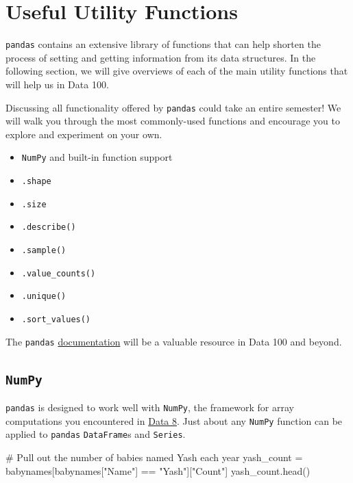 \documentclass[
  letterpaper,
  DIV=11,
  numbers=noendperiod]{scrreprt}
\newenvironment{Shaded}{\begin{snugshade}}{\end{snugshade}}
\newcommand{\CommentTok}[1]{\textcolor[rgb]{0.37,0.37,0.37}{#1}}
\newcommand{\NormalTok}[1]{\textcolor[rgb]{0.00,0.23,0.31}{#1}}
\newcommand{\OperatorTok}[1]{\textcolor[rgb]{0.37,0.37,0.37}{#1}}
\newcommand{\StringTok}[1]{\textcolor[rgb]{0.13,0.47,0.30}{#1}}
\providecommand{\tightlist}{%
  \setlength{\itemsep}{0pt}\setlength{\parskip}{0pt}}\usepackage{longtable,booktabs,array}
\begin{document}
\hypertarget{useful-utility-functions}{%
\section{Useful Utility Functions}\label{useful-utility-functions}}

\texttt{pandas} contains an extensive library of functions that can help
shorten the process of setting and getting information from its data
structures. In the following section, we will give overviews of each of
the main utility functions that will help us in Data 100.

Discussing all functionality offered by \texttt{pandas} could take an
entire semester! We will walk you through the most commonly-used
functions and encourage you to explore and experiment on your own.

\begin{itemize}
\tightlist
\item
  \texttt{NumPy} and built-in function support
\item
  \texttt{.shape}
\item
  \texttt{.size}
\item
  \texttt{.describe()}
\item
  \texttt{.sample()}
\item
  \texttt{.value\_counts()}
\item
  \texttt{.unique()}
\item
  \texttt{.sort\_values()}
\end{itemize}

The \texttt{pandas}
\href{https://pandas.pydata.org/docs/reference/index.html}{documentation}
will be a valuable resource in Data 100 and beyond.

\hypertarget{numpy}{%
\subsection{\texorpdfstring{\texttt{NumPy}}{NumPy}}\label{numpy}}

\texttt{pandas} is designed to work well with \texttt{NumPy}, the
framework for array computations you encountered in
\href{https://www.data8.org/su23/reference/\#array-functions-and-methods}{Data
8}. Just about any \texttt{NumPy} function can be applied to
\texttt{pandas} \texttt{DataFrame}s and \texttt{Series}.

\begin{Shaded}
\begin{Highlighting}[]
\CommentTok{\# Pull out the number of babies named Yash each year}
\NormalTok{yash\_count }\OperatorTok{=}\NormalTok{ babynames[babynames[}\StringTok{"Name"}\NormalTok{] }\OperatorTok{==} \StringTok{"Yash"}\NormalTok{][}\StringTok{"Count"}\NormalTok{]}
\NormalTok{yash\_count.head()}
\end{Highlighting}
\end{Shaded}
\end{document}
